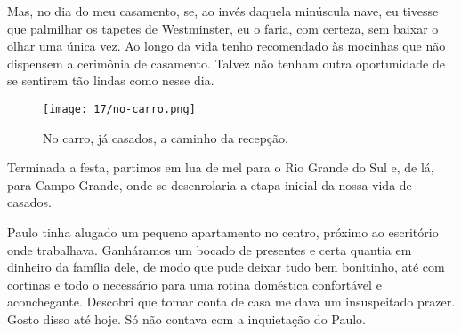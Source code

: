 Mas, no dia do meu casamento, se, ao invés daquela minúscula nave, eu tivesse que palmilhar os tapetes de Westminster, eu o faria, com certeza, sem baixar o olhar uma única vez.
Ao longo da vida tenho recomendado às mocinhas que não dispensem a cerimônia de casamento.
Talvez não tenham outra oportunidade de se sentirem tão lindas como nesse dia.

\begin{figure}[H]
\centering
\texttt{[image: 17/no-carro.png]}
\caption{No carro, já casados, a caminho da recepção.}
\end{figure}

Terminada a festa, partimos em lua de mel para o Rio Grande do Sul e, de lá, para Campo Grande, onde se desenrolaria a etapa inicial da nossa vida de casados.

Paulo tinha alugado um pequeno apartamento no centro, próximo ao escritório onde trabalhava.
Ganháramos um bocado de presentes e certa quantia em dinheiro da família dele, de modo que pude deixar tudo bem bonitinho, até com cortinas e todo o necessário para uma rotina doméstica confortável e aconchegante.
Descobri que tomar conta de casa me dava um insuspeitado prazer.
Gosto disso até hoje.
Só não contava com a inquietação do Paulo.
